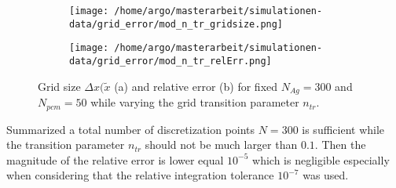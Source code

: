 \documentclass{scrartcl}[12pt, halfparskip]
\numberwithin{equation}{section}
\numberwithin{figure}{section}
\numberwithin{table}{section}
\begin{document}
\begin{figure}[H]
	\begin{subfigure}{0.49\textwidth}
		\texttt{[image: /home/argo/masterarbeit/simulationen-data/grid\_error/mod\_n\_tr\_gridsize.png]}
		\caption{}
		\label{fig:gridsize_mod_n_tr}
	\end{subfigure}
	\begin{subfigure}{0.49\textwidth}
		\texttt{[image: /home/argo/masterarbeit/simulationen-data/grid\_error/mod\_n\_tr\_relErr.png]}
		\caption{}
		\label{fig:grid_relErr_mod_n_tr}
	\end{subfigure}
	\caption{Grid size $\Delta x(\tilde{x}$ (a) and relative error (b) for fixed $N_{Ag}=300$ and $N_{pcm}=50$ while varying the grid transition parameter $n_{tr}$.}
	\label{fig:grid_mod_n_tr}
\end{figure}

Summarized a total number of discretization points $N=300$ is sufficient while the transition parameter $n_{tr}$ should not be much larger than $0.1$. Then the magnitude of the relative error is lower equal $10^{-5}$ which is negligible especially when considering that the relative integration tolerance $10^{-7}$ was used.
\end{document}

